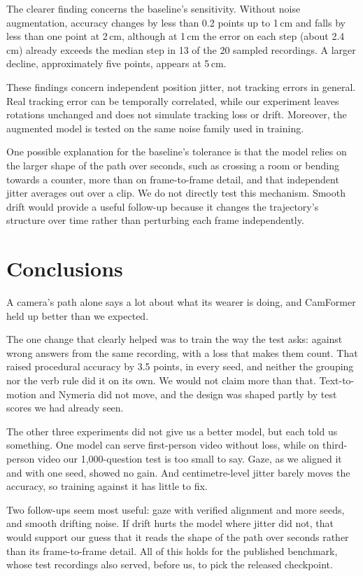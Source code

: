 \documentclass[10pt,twocolumn,letterpaper]{article}
\begin{document}
The clearer finding concerns the baseline's sensitivity. Without noise augmentation, accuracy changes by less than
0.2 points up to 1\,cm and falls by less than one point at 2\,cm, although at 1\,cm the error on each step (about
2.4\,cm) already exceeds the median step in 13 of the 20 sampled recordings. A larger decline, approximately five
points, appears at 5\,cm.

These findings concern independent position jitter, not tracking errors in general. Real tracking error can be
temporally correlated, while our experiment leaves rotations unchanged and does not simulate tracking loss or
drift. Moreover, the augmented model is tested on the same noise family used in training.

One possible explanation for the baseline's tolerance is that the model relies on the larger shape of the path over
seconds, such as crossing a room or bending towards a counter, more than on frame-to-frame detail, and that
independent jitter averages out over a clip. We do not directly test this mechanism. Smooth drift would provide a
useful follow-up because it changes the trajectory's structure over time rather than perturbing each frame
independently.

\section{Conclusions}
A camera's path alone says a lot about what its wearer is doing, and CamFormer held up better than we expected.

The one change that clearly helped was to train the way the test asks: against wrong answers from the same
recording, with a loss that makes them count. That raised procedural accuracy by 3.5 points, in every seed, and
neither the grouping nor the verb rule did it on its own. We would not claim more than that. Text-to-motion and
Nymeria did not move, and the design was shaped partly by test scores we had already seen.

The other three experiments did not give us a better model, but each told us something. One model can serve
first-person video without loss, while on third-person video our 1,000-question test is too small to say. Gaze, as
we aligned it and with one seed, showed no gain. And centimetre-level jitter barely moves the accuracy, so
training against it has little to fix.

Two follow-ups seem most useful: gaze with verified alignment and more seeds, and smooth drifting noise. If drift
hurts the model where jitter did not, that would support our guess that it reads the shape of the path over seconds
rather than its frame-to-frame detail. All of this holds for the published benchmark, whose test recordings also
served, before us, to pick the released checkpoint.

{\small


}
\end{document}
